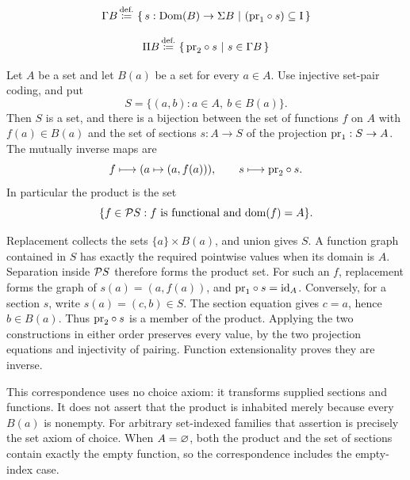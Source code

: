 \begin{definition}
\[
\Gamma B\,{\stackrel{{\textrm{def.}}}{\coloneqq}}\,\left\{\,s:\mathrm{Dom}(B)\to\Sigma B\ \middle|\ (\mathrm{pr}_1\circ s) \subseteq \mathrm{I}\,\right\}
\]
\end{definition}
\begin{definition}
\[
\Pi B \,{\stackrel{{\textrm{def.}}}{\coloneqq}}\, \left\{\,\mathrm{pr}_2\circ s\ \middle|\ s\in \Gamma B\,\right\}
\]
\end{definition}

\begin{theorem}
Let $A$ be a set and let $B(a)$ be a set for every $a\in A$.
Use injective set-pair coding, and put
\[
S=\{(a,b):a\in A,\ b\in B(a)\}.
\]
Then $S$ is a set, and there is a bijection between the set of functions
$f$ on $A$ with $f(a)\in B(a)$ and the set of sections
$s:A\to S$ of the projection $\mathrm{pr}_1:S\to A$. The mutually inverse maps are
\[
f\longmapsto(a\mapsto(a,f(a))),\qquad
s\longmapsto\mathrm{pr}_2\circ s.
\]
In particular the product is the set
\[
\{f\in\mathcal{P} S:f\text{ is functional and }\mathrm{dom}(f)=A\}.
\]
\end{theorem}
\Proof
Replacement collects the sets $\{a\}\times B(a)$, and union gives $S$.
A function graph contained in $S$ has exactly the required pointwise
values when its domain is $A$. Separation inside $\mathcal{P} S$ therefore
forms the product set. For such an $f$, replacement forms the graph of
$s(a)=(a,f(a))$, and $\mathrm{pr}_1\circ s=\operatorname{id}_A$.
Conversely, for a section $s$, write $s(a)=(c,b)\in S$.
The section equation gives $c=a$, hence $b\in B(a)$. Thus
$\mathrm{pr}_2\circ s$ is a member of the product. Applying the two constructions
in either order preserves every value, by the two projection equations
and injectivity of pairing. Function extensionality proves they are inverse.
\Done

This correspondence uses no choice axiom: it transforms supplied sections
and functions. It does not assert that the product is inhabited merely
because every $B(a)$ is nonempty. For arbitrary set-indexed families that
assertion is precisely the set axiom of choice. When $A=\varnothing$,
both the product and the set of sections contain exactly the empty
function, so the correspondence includes the empty-index case.

